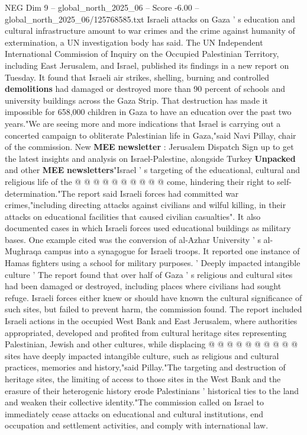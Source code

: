 \begin{textsample}{NEG Dim 9 – global\_north\_2025\_06 – Score -6.00 – global\_north\_2025\_06/125768585.txt}  \label{ex:f9_neg_079}
Israeli attacks on Gaza ' s education and cultural infrastructure amount to war crimes and the crime against humanity of extermination, a UN investigation body has said.
The UN Independent International Commission of Inquiry on the Occupied Palestinian Territory, including East Jerusalem, and Israel, published its findings in a new report on Tuesday.
It found that Israeli air strikes, shelling, burning and controlled \textbf{demolitions} had damaged or destroyed more than 90 percent of schools and university buildings across the Gaza Strip.
That destruction has made it impossible for 658,000 children in Gaza to have an education over the past two years."We are seeing more and more indications that Israel is carrying out a concerted campaign to obliterate Palestinian life in Gaza,"said Navi Pillay, chair of the commission.
New \textbf{MEE} \textbf{newsletter} : Jerusalem Dispatch Sign up to get the latest insights and analysis on Israel-Palestine, alongside Turkey \textbf{Unpacked} and other \textbf{MEE} \textbf{newsletters}"Israel ' s targeting of the educational, cultural and religious life of the @ @ @ @ @ @ @ @ @ @ come, hindering their right to self-determination."The report said Israeli forces had committed war crimes,"including directing attacks against civilians and wilful killing, in their attacks on educational facilities that caused civilian casualties".
It also documented cases in which Israeli forces used educational buildings as military bases.
One example cited was the conversion of al-Azhar University ' s al-Mughraqa campus into a synagogue for Israeli troops.
It reported one instance of Hamas fighters using a school for military purposes. ' Deeply impacted intangible culture ' The report found that over half of Gaza ' s religious and cultural sites had been damaged or destroyed, including places where civilians had sought refuge.
Israeli forces either knew or should have known the cultural significance of such sites, but failed to prevent harm, the commission found.
The report included Israeli actions in the occupied West Bank and East Jerusalem, where authorities appropriated, developed and profited from cultural heritage sites representing Palestinian, Jewish and other cultures, while displacing @ @ @ @ @ @ @ @ @ @ sites have deeply impacted intangible culture, such as religious and cultural practices, memories and history,"said Pillay."The targeting and destruction of heritage sites, the limiting of access to those sites in the West Bank and the erasure of their heterogenic history erode Palestinians ' historical ties to the land and weaken their collective identity."The commission called on Israel to immediately cease attacks on educational and cultural institutions, end occupation and settlement activities, and comply with international law.

\end{textsample}
